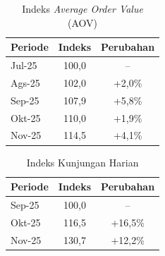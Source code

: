 \begin{table}[!htbp]
    \centering
    \caption{Indeks \textit{Average Order Value} (AOV)}
    \label{tab:indeks_aov_grabfood}
    \begin{tabular}{|l|c|c|}
        \toprule
        \textbf{Periode} & \textbf{Indeks} & \textbf{Perubahan} \\ \hline
        \midrule
        Jul-25           & 100,0           & --                 \\ \hline
        Ags-25           & 102,0           & +2,0\%             \\ \hline
        Sep-25           & 107,9           & +5,8\%             \\ \hline
        Okt-25           & 110,0           & +1,9\%             \\ \hline
        Nov-25           & 114,5           & +4,1\%             \\ \hline
        \bottomrule
    \end{tabular}
\end{table}

\begin{table}[!htbp]
    \centering
    \caption{Indeks Kunjungan Harian}
    \label{tab:indeks_kunjungan_grabfood}
    \begin{tabular}{|l|c|c|}
        \toprule
        \textbf{Periode} & \textbf{Indeks} & \textbf{Perubahan} \\ \hline
        \midrule
        Sep-25           & 100,0           & --                 \\ \hline
        Okt-25           & 116,5           & +16,5\%            \\ \hline
        Nov-25           & 130,7           & +12,2\%            \\ \hline
        \bottomrule
    \end{tabular}
\end{table}

